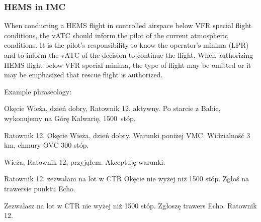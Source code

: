 \subsubsection{HEMS in IMC}
When conducting a HEMS flight in controlled airspace below VFR special flight conditions, the vATC should inform the pilot of the current atmospheric conditions. It is the pilot's responsibility to know the operator's minima (LPR) and to inform the vATC of the decision to continue the flight. When authorizing HEMS flight below VFR special minima, the type of flight may be omitted or it may be emphasized that rescue flight is authorized.

Example phraseology:
\begin{addmargin}[1em]{1em}
    Okęcie Wieża, dzień dobry, Ratownik 12, aktywny. Po starcie z Babic, wykonujemy na Górę Kalwarię, 1500~stóp.

    Ratownik 12, Okęcie Wieża, dzień dobry. Warunki poniżej VMC. Widzialność 3 km, chmury OVC 300 stóp.

    Wieża, Ratownik 12, przyjąłem. Akceptuję warunki.

    Ratownik 12, zezwalam na lot w CTR Okęcie nie wyżej niż 1500 stóp. Zgłoś na trawersie punktu Echo.

    Zezwalasz na lot w CTR nie wyżej niż 1500 stóp. Zgłoszę trawers Echo. Ratownik 12.
\end{addmargin}